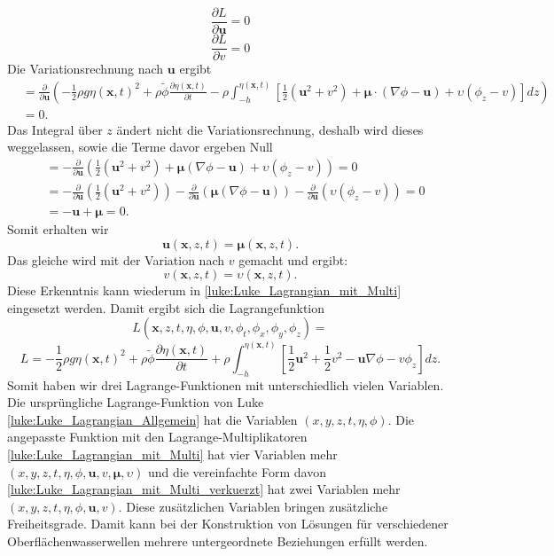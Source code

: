 \[
\frac{\partial L}{\partial \bm{u}} = 0
\]
\[
\frac{\partial L}{\partial v} = 0
\]
Die Variationsrechnung nach $\bm{u}$ ergibt
\begin{align*}
	&= \frac{\partial \mathscr{}}{\partial \bm{u}}\left( -\frac{1}{2} \rho g \eta(\bm{x},t)^2 + \rho\tilde{\phi} \frac{\partial\eta(\bm{x},t)}{\partial t} -\rho \int_{-h}^{\eta(\bm{x},t)} \left[ \frac{1}{2} (\bm{u}^2 + v^2) + \bm{\mu} \cdot (\nabla\phi - \bm{u}) + \upsilon \left(\phi_z - v\right) \right] dz\right)
	\\
	&= 0.
\end{align*}
Das Integral über $z$ ändert nicht die Variationsrechnung, deshalb wird dieses weggelassen, sowie die Terme davor ergeben Null
\begin{align*}
	&= -\frac{\partial}{\partial \bm{u}} \left(\frac{1}{2} (\bm{u}^2 + v^2) + \bm{\mu} (\nabla\phi - \bm{u}) + \upsilon \left(\phi_z - v\right) \right) = 0
	\\
	&= -\frac{\partial}{\partial \bm{u}} \left( \frac{1}{2} (\bm{u}^2 + v^2) \right)  -\frac{\partial}{\partial \bm{u}} \left( \bm{\mu} (\nabla\phi - \bm{u}) \right)  -\frac{\partial}{\partial \bm{u}} \left( \upsilon \left(\phi_z - v\right) \right) = 0
	\\
	&=
	-\bm{u}
	+\bm{\mu}
	= 0.
\end{align*}
Somit erhalten wir
\begin{equation}
	\bm{u}(\bm{x},z,t) = \bm{\mu}(\bm{x},z,t).
\end{equation}
Das gleiche wird mit der Variation nach $v$ gemacht und ergibt:
\begin{equation}
	v(\bm{x},z,t) = \upsilon(\bm{x},z,t).
\end{equation}
Diese Erkenntnis kann wiederum in \eqref{luke:Luke_Lagrangian_mit_Multi} eingesetzt werden.
Damit ergibt sich die Lagrangefunktion
\[
L(\bm{x},z,t,\eta,\phi,\bm{u}, v,\phi_t,\phi_x, \phi_y, \phi_z)
=
\]
\begin{equation}
	L
	=
	-
	\frac{1}{2}\rho g \eta(\bm{x},t)^2
	+
	\rho\tilde{\phi} \frac{\partial\eta(\bm{x},t)}{\partial t}
	+
	\rho\int_{-h}^{\eta(\bm{x},t)} \left[ \frac{1}{2} \bm{u}^2 + \frac{1}{2} v^2 - \bm{u} \nabla \phi - v \phi_z \right] dz.
	\label{luke:Luke_Lagrangian_mit_Multi_verkuerzt}
\end{equation}
Somit haben wir drei Lagrange-Funktionen mit unterschiedlich vielen Variablen.
Die ursprüngliche Lagrange-Funktion von Luke \eqref{luke:Luke_Lagrangian_Allgemein} hat die Variablen $(x,y,z,t,\eta,\phi)$.
Die angepasste Funktion mit den Lagrange-Multiplikatoren \eqref{luke:Luke_Lagrangian_mit_Multi} hat vier Variablen mehr $(x,y,z,t,\eta,\phi,\bm{u},v,\bm{\mu},\upsilon)$ und die vereinfachte Form davon \eqref{luke:Luke_Lagrangian_mit_Multi_verkuerzt} hat zwei Variablen mehr $(x,y,z,t,\eta,\phi,\bm{u},v)$.
Diese zusätzlichen Variablen bringen zusätzliche Freiheitsgrade.
Damit kann bei der Konstruktion von Lösungen für verschiedener Oberflächenwasserwellen mehrere untergeordnete Beziehungen erfüllt werden.

